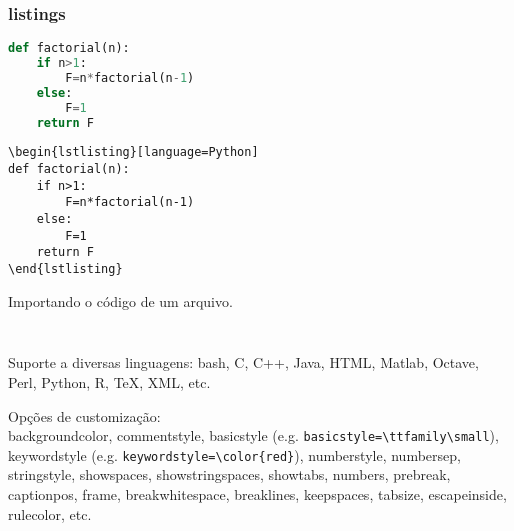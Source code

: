 \begin{frame}
\frametitle{listings}

\begin{footnotesize}
\begin{lstlisting}[language=Python, label=lst-listings1, caption={Inserindo o código direto no aquiro \texttt{.tex}.}, postbreak=\mbox{$\hookrightarrow$\space}, basicstyle=\fontsize{8}{10}\selectfont\ttfamily]
def factorial(n):
    if n>1:
        F=n*factorial(n-1)
    else:
        F=1
    return F
\end{lstlisting}

\begin{verbatim}
\begin{lstlisting}[language=Python]
def factorial(n):
    if n>1:
        F=n*factorial(n-1)
    else:
        F=1
    return F
\end{lstlisting}
\end{verbatim}
\end{footnotesize}

\framebreak

Importando o código de um arquivo.
\begin{verbatim}

\end{verbatim}


\framebreak
\begin{verbatim}

\end{verbatim}



\framebreak
Suporte a diversas linguagens: bash, C, C++, Java, HTML, Matlab, Octave, Perl, Python, R, TeX, XML, etc.
\vspace{3ex}

Opções de customização: \\
backgroundcolor, 
commentstyle,
basicstyle (e.g. \verb|basicstyle=\ttfamily\small|),
keywordstyle (e.g. \verb|keywordstyle=\color{red}|),
numberstyle,
numbersep,
stringstyle,
showspaces,
showstringspaces,
showtabs,
numbers, 
prebreak,
captionpos,
frame,
breakwhitespace,
breaklines,
keepspaces,
tabsize,
escapeinside,
rulecolor, etc.

\end{frame}

